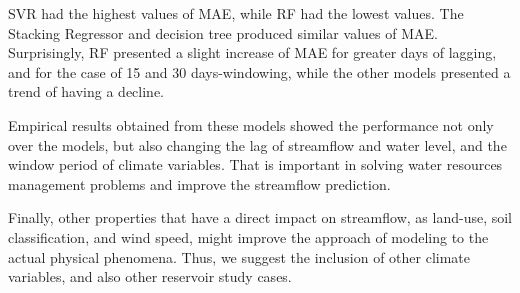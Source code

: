 \documentclass[12pt]{article}
\begin{document}
SVR had the highest values of MAE, while RF had the lowest values. The Stacking Regressor and decision tree produced similar values of MAE. Surprisingly, RF presented a slight increase of MAE for greater days of lagging, and for the case of 15 and 30 days-windowing, while the other models presented a trend of having a decline.

Empirical results obtained from these models showed the performance not only over the models, but also changing the lag of streamflow and water level, and the window period of climate variables. That is important in solving water resources management problems and improve the streamflow prediction.

Finally, other properties that have a direct impact on streamflow, as land-use, soil classification, and wind speed, might improve the approach of modeling to the actual physical phenomena. Thus, we suggest the inclusion of other climate variables, and also other reservoir study cases.





\appendix

\end{document}
